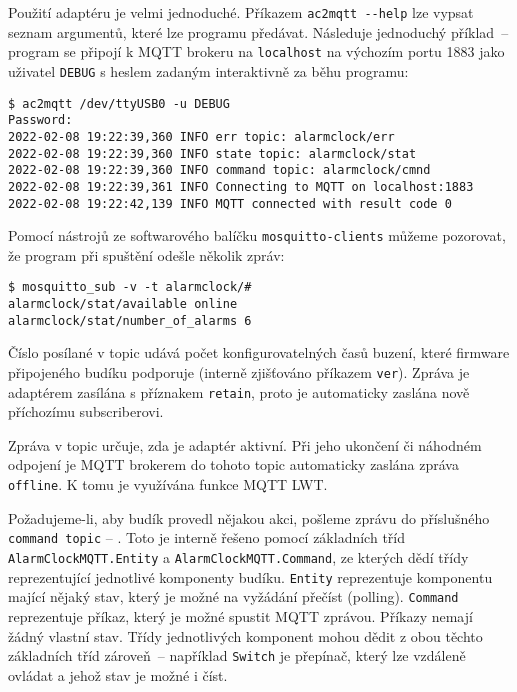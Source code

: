 Použití adaptéru je velmi jednoduché. Příkazem \verb|ac2mqtt --help|
lze vypsat seznam argumentů, které lze programu předávat.
Následuje jednoduchý příklad~-- program se připojí k MQTT brokeru na
\texttt{localhost} na výchozím portu 1883 jako uživatel \texttt{DEBUG} s heslem
zadaným interaktivně za běhu programu:
\begin{lstlisting}[style=terminal]
$ ac2mqtt /dev/ttyUSB0 -u DEBUG
Password:
2022-02-08 19:22:39,360 INFO err topic: alarmclock/err
2022-02-08 19:22:39,360 INFO state topic: alarmclock/stat
2022-02-08 19:22:39,360 INFO command topic: alarmclock/cmnd
2022-02-08 19:22:39,361 INFO Connecting to MQTT on localhost:1883
2022-02-08 19:22:42,139 INFO MQTT connected with result code 0

\end{lstlisting}

Pomocí nástrojů ze softwarového balíčku \texttt{mosquitto-clients}
můžeme pozorovat, že program při spuštění odešle několik zpráv:
\begin{lstlisting}[style=terminal]
$ mosquitto_sub -v -t alarmclock/#
alarmclock/stat/available online
alarmclock/stat/number_of_alarms 6
\end{lstlisting}
Číslo posílané v topic  udává počet
konfigurovatelných časů buzení, které firmware připojeného budíku podporuje
(interně zjišťováno příkazem \texttt{ver}). Zpráva je adaptérem zasílána
s příznakem \texttt{retain}, proto je automaticky zaslána nově příchozímu
subscriberovi.

Zpráva v topic  určuje, zda je adaptér
aktivní. Při jeho ukončení či náhodném odpojení je MQTT brokerem do tohoto
topic automaticky zaslána zpráva \texttt{offline}. K tomu je využívána funkce
MQTT \ac{LWT}.

Požadujeme-li, aby budík provedl nějakou akci, pošleme zprávu do příslušného
\texttt{command topic} -- .
Toto je interně řešeno pomocí základních tříd \texttt{AlarmClockMQTT.Entity}
a \texttt{AlarmClockMQTT.Command}, ze kterých dědí třídy reprezentující
jednotlivé komponenty budíku. \texttt{Entity} reprezentuje komponentu mající
nějaký stav, který je možné na vyžádání přečíst
(\foreignlanguage{english}{polling}). \texttt{Command} reprezentuje příkaz,
který je možné spustit MQTT zprávou. Příkazy nemají žádný vlastní stav.
Třídy jednotlivých komponent mohou dědit z obou těchto základních tříd
zároveň~-- například \texttt{Switch} je přepínač, který lze vzdáleně ovládat
a jehož stav je možné i číst.

